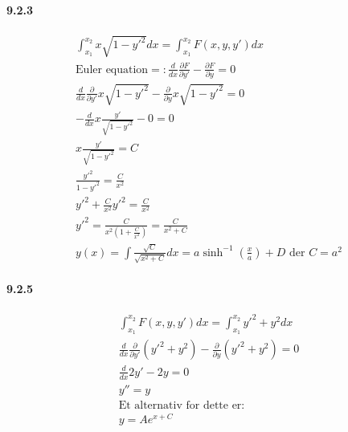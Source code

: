 \documentclass[11pt, A4paper,norsk]{article}
\begin{document}
		\paragraph{9.2.3}
			\begin{gather*}
\int_{x_1}^{x_2} x \sqrt{1 - y'^2} dx = \int_{x_1}^{x_2} F(x, y, y') dx \\
\text{Euler equation} =: \frac{d}{dx} \frac{\partial F}{\partial y'} - \frac{\partial F}{\partial y} = 0 \\
\frac{d}{dx} \frac{\partial}{\partial y'} x \sqrt{1 - y'^2} - \frac{\partial}{\partial y} x \sqrt{1 - y'^2} = 0 \\
- \frac{d}{dx} x \frac{y'}{\sqrt{1 - y'^2}} - 0 = 0 \\
x \frac{y'}{\sqrt{1 - y'^2}} = C \\
\frac{y'^2}{1 - y'^2} = \frac{C}{x^2} \\
y'^2 + \frac{C}{x^2} y'^2 = \frac{C}{x^2} \\
y'^2 = \frac{C}{x^2\left( 1 + \frac{C}{x^2} \right)} = \frac{C}{x^2 + C} \\
y(x) = \int \frac{\sqrt{C}}{\sqrt{x^2 + C}} dx = a \sinh^{-1}\left( \frac{x}{a} \right) + D \text{ der $C = a^2$}
			\end{gather*}










		\paragraph{9.2.5}
			\begin{gather*}
\int_{x_1}^{x_2} F(x, y, y') dx = \int_{x_1}^{x_2} y'^2 + y^2 dx \\
\frac{d}{dx} \frac{\partial}{\partial y'} \left( y'^2 + y^2 \right) - \frac{\partial}{\partial y} \left( y'^2 + y^2 \right) = 0 \\
\frac{d}{dx} 2y' - 2y = 0 \\
y'' = y \\
\text{Et alternativ for dette er:} \\
y = A e^{x + C}
			\end{gather*}
\end{document}
